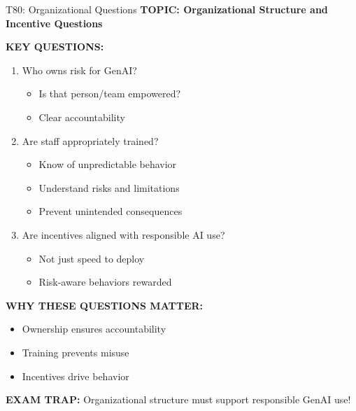 \documentclass[8pt]{beamer}
\begin{document}
	\begin{frame}{T80: Organizational Questions}
		\fontsize{6.5}{7.5}\selectfont
		\textbf{TOPIC: Organizational Structure and Incentive Questions}
		
		\vspace{0.1cm}
		\textbf{KEY QUESTIONS:}
		\begin{enumerate}
			\item \textcolor{myblue}{Who owns risk for GenAI?}
			\begin{itemize}
				\item Is that person/team empowered?
				\item Clear accountability
			\end{itemize}
			\item \textcolor{myblue}{Are staff appropriately trained?}
			\begin{itemize}
				\item Know of unpredictable behavior
				\item Understand risks and limitations
				\item Prevent unintended consequences
			\end{itemize}
			\item \textcolor{myblue}{Are incentives aligned with responsible AI use?}
			\begin{itemize}
				\item Not just speed to deploy
				\item Risk-aware behaviors rewarded
			\end{itemize}
		\end{enumerate}
		
		\vspace{0.1cm}
		\textbf{WHY THESE QUESTIONS MATTER:}
		\begin{itemize}
			\item Ownership ensures accountability
			\item Training prevents misuse
			\item Incentives drive behavior
		\end{itemize}
		
		\textcolor{myred}{\textbf{EXAM TRAP:}} Organizational structure must \textcolor{myblue}{support responsible GenAI use}!
	\end{frame}
	
\end{document}
